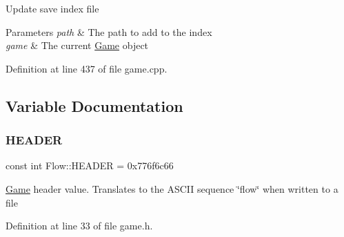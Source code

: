 Update save index file 
\begin{DoxyParams}{Parameters}
{\em path} & The path to add to the index \\
\hline
{\em game} & The current \hyperlink{class_flow_1_1_game}{Game} object \\
\hline
\end{DoxyParams}


Definition at line 437 of file game.\+cpp.



\subsection{Variable Documentation}
\hypertarget{namespace_flow_a67f232b0dafe43785c035732008ae778}{}\label{namespace_flow_a67f232b0dafe43785c035732008ae778} 
\subsubsection{\texorpdfstring{H\+E\+A\+D\+ER}{HEADER}}
{\footnotesize\ttfamily const int Flow\+::\+H\+E\+A\+D\+ER = 0x776f6c66}

\hyperlink{class_flow_1_1_game}{Game} header value. Translates to the A\+S\+C\+II sequence \char`\"{}flow\char`\"{} when written to a file 

Definition at line 33 of file game.\+h.

